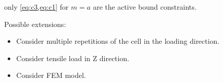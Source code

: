  only \cref{eq:c3,eq:c1} for $m=a$ are the active bound constraints.



Possible extensions:
\begin{itemize}
	\item Consider multiple repetitions of the cell in the loading direction.
	\item Consider tensile load in Z direction.
	\item Consider FEM model.
\end{itemize}

